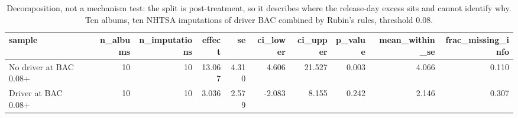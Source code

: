 \begin{table}
\caption{Decomposition, not a mechanism test: the split is post-treatment, so it describes where the release-day excess sits and cannot identify why. Ten albums, ten NHTSA imputations of driver BAC combined by Rubin's rules, threshold 0.08.}
\begin{tabular}{lrrrrrrrrr}
\toprule
sample & n\_albums & n\_imputations & effect & se & ci\_lower & ci\_upper & p\_value & mean\_within\_se & frac\_missing\_info \\
\midrule
No driver at BAC 0.08+ & 10 & 10 & 13.067 & 4.310 & 4.606 & 21.527 & 0.003 & 4.066 & 0.110 \\
Driver at BAC 0.08+ & 10 & 10 & 3.036 & 2.579 & -2.083 & 8.155 & 0.242 & 2.146 & 0.307 \\
\bottomrule
\end{tabular}
\end{table}

